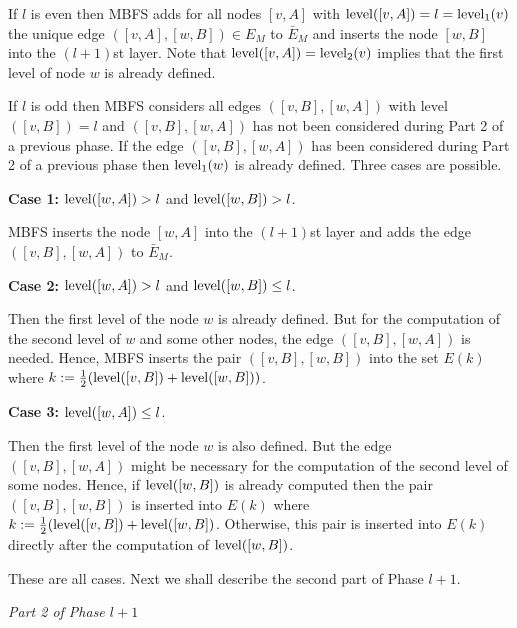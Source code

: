 \documentclass[12pt,twoside,a4paper]{article}
\def\lev{{\rm level}}
\begin{document}
\medskip
If $l$ is even then MBFS adds for all nodes $[v,A]$ with $\lev([v,A]) = l = \lev_1(v)$ 
the unique edge $([v,A],[w,B]) \in E_M$ to $\bar{E}_M$ and inserts the node $[w,B]$ into 
the $(l+1)$st layer. Note that $\lev([v,A]) = \lev_2(v)$ implies that the first level of
node $w$ is already defined.

If $l$ is odd then MBFS considers all edges 
$([v,B],[w,A])$ with level$([v,B]) = l$ and $([v,B],[w,A])$ has not been considered 
during Part 2 of a previous phase. If the edge $([v,B],[w,A])$ has been considered during
Part 2 of a previous phase then $\lev_1(w)$ is already defined. Three cases are possible.

\medskip
\noindent
{\bf Case 1:} $\lev([w,A]) > l$ and $\lev([w,B]) > l$.

\medskip
MBFS inserts the node $[w,A]$ into the $(l+1)$st layer and adds the edge
$([v,B],[w,A])$ to $\bar{E}_M$.

\medskip
\noindent
{\bf Case 2:} $\lev([w,A]) > l$ and $\lev([w,B]) \leq l$.

\medskip
Then the first level of the node $w$ is already defined. But for the computation of the
second level of $w$ and some other nodes, the edge $([v,B],[w,A])$ is needed. Hence, MBFS 
inserts the pair
$([v,B],[w,B])$ into the set $E(k)$ where $k := \frac{1}{2}(\lev([v,B]) + \lev([w,B]))$.

\medskip
\noindent
{\bf Case 3:} $\lev([w,A]) \leq l$.

\medskip
Then the first level of the node $w$ is also defined. 
But the edge $([v,B],[w,A])$ might be necessary for the computation of the second level of 
some nodes. Hence, if $\lev([w,B])$ is already computed then the pair $([v,B],[w,B])$ is 
inserted into $E(k)$ where $k := \frac{1}{2}(\lev([v,B]) + \lev([w,B])$. Otherwise, this pair 
is inserted into $E(k)$ directly after the computation of $\lev([w,B])$.

\medskip
These are all cases. Next we shall describe the second part of Phase $l+1$.

\medskip
\noindent
{\em Part 2 of Phase $l+1$}
\end{document}
